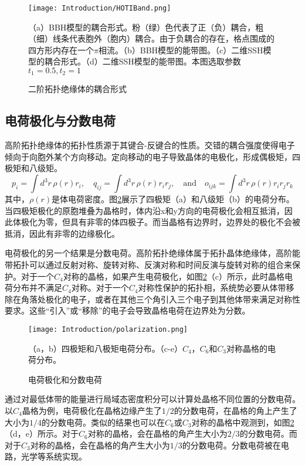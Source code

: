 \begin{figure}[htbp]
    \centering
    \texttt{[image: Introduction/HOTIBand.png]}
    \caption{二阶拓扑绝缘体的耦合形式}
    \label{fig:HOTIBand}
    （a）BBH模型的耦合形式。粉（绿）色代表了正（负）耦合，粗（细）线条代表胞外（胞内）耦合。由于负耦合的存在，格点围成的四方形内存在一个$\pi$相流。（b）BBH模型的能带图。（c）二维SSH模型的耦合形式。（d）二维SSH模型的能带图。本图选取参数$t_1=0.5, t_2=1$
\end{figure}

\subsection{电荷极化与分数电荷}
高阶拓扑绝缘体的拓扑性质源于其键合-反键合的性质。交错的耦合强度使得电子倾向于向胞外某个方向移动。定向移动的电子导致晶体的电极化，形成偶极矩，四极矩和八级矩。
\begin{equation}
p_i = \int d^3r \, \rho(r) r_i, \quad 
q_{ij} = \int d^3r \, \rho(r) r_i r_j, \quad \text{and} \quad
o_{ijk} = \int d^3r \, \rho(r) r_i r_j r_k
\end{equation}
其中，$\rho(r)$是体电荷密度。图\ref{fig:polarization}展示了四极矩（a）和八级矩（b）的电荷分布。当四极矩极化的原胞堆叠为晶格时，体内沿x和y方向的电荷极化会相互抵消，因此体极化为零，但具有非零的体四极子。而当晶格有边界时，边界处的极化不会被抵消，因此有非零的边缘极化。

电荷极化的另一个结果是分数电荷\cite{benalcazar2019quantization}。高阶拓扑绝缘体属于拓扑晶体绝缘体\cite{xie2021higher,noh2018topological}，高阶能带拓扑可以通过反射对称\cite{langbehn2017reflection}、旋转对称\cite{schindler2018higher}、反演对称\cite{khalaf2018higher}和时间反演与旋转对称的组合\cite{geier2018second}来保护。对于一个$C_4$对称的晶格，如果产生电荷极化，如图\ref{fig:polarization}（c）所示，此时晶格电荷分布并不满足$C_4$对称。对于一个$C_4$对称性保护的拓扑相，系统势必要从体带移除在角落处极化的电子，或者在其他三个角引入三个电子到其他体带来满足对称性要求。这些“引入”或“移除”的电子会导致晶格电荷在边界处为分数。

\begin{figure}[htbp]
    \centering
    \texttt{[image: Introduction/polarization.png]}
    \caption{电荷极化和分数电荷}（a，b）四极矩和八极矩电荷分布。（c-e）$C_4$，$C_6$和$C_3$对称晶格的电荷分布。
    \label{fig:polarization}
\end{figure}

通过对最低体带的能量进行局域态密度积分可以计算处晶格不同位置的分数电荷。以$C_4$晶格为例，电荷极化在晶格边缘产生了$1/2$的分数电荷，在晶格的角上产生了大小为$1/4$的分数电荷。类似的结果也可以在$C_6$或$C_3$对称的晶格中观测到，如图\ref{fig:polarization}（d，e）所示。对于$C_6$对称的晶格，会在晶格的角产生大小为$2/3$的分数电荷。而对于$C_3$对称的晶格，会在晶格的角产生大小为$1/3$的分数电荷。分数电荷被在电路\cite{peterson2020fractional}，光学\cite{liu2021bulk}等系统实现。

